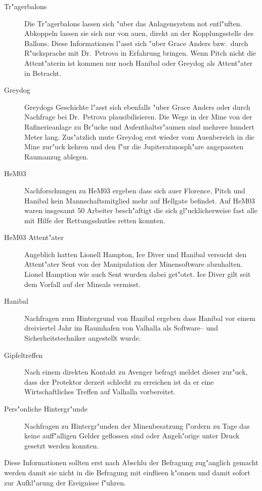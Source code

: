 \begin{description}
	\item[Tr"agerbalons] Die Tr"agerbalons lassen sich "uber das Anlagensystem not entl"uften. Abkoppeln lassen sie sich nur von au\3en, 
		direkt an der Kopplungsstelle des Ballons. Diese Informationen l"asst sich "uber Grace Anders bzw.~durch R"ucksprache mit Dr.~Petrova in Erfahrung bringen. Wenn Pitch nicht die Attent"aterin ist kommen nur noch Hanibal oder Greydog als Attent"ater in Betracht.
	\item[Greydog] Greydogs Geschichte l"asst sich ebenfalls "uber Grace Anders oder durch Nachfrage bei Dr.~Petrova plausibilisieren. Die 
		Wege in der Mine von der Rafinerieanlage zu Br"ucke und Aufenthaltsr"aumen sind mehrere hundert Meter lang. Zus"atzlich mu\3te Greydog erst wieder vom Au\3enbereich in die Mine zur"uck kehren und den f"ur die Jupiteratmosph"are angepassten Raumanzug ablegen.
	\item[HeM03] Nachforschungen zu HeM03 ergeben dass sich au\3er Florence, Pitch und Hanibal kein Mannschaftsmitglied mehr auf Hellgate befindet. Auf HeM03 waren insgesamt 50 Arbeiter besch"aftigt die sich gl"ucklicherweise fast alle mit Hilfe der Rettungsshutles retten konnten. 
	\item[HeM03 Attent"ater] Angeblich hatten Lionell Hampton, Ice Diver und Hanibal versucht den Attent"ater Sent von der Manipulation der 
		Minensoftware abzuhalten. Lionel Hamption wie auch Sent wurden dabei get"otet. Ice Diver gilt seit dem Vorfall auf der Mineals vermisst.
	\item[Hanibal] Nachfragen zum Hintergrund von Hanibal ergeben dass Hanibal vor einem dreiviertel Jahr im Raumhafen von Valhalla als 
		Software-- und Sicherheitstechniker angestellt wurde.
	\item[Gipfeltreffen] Nach einem direkten Kontakt zu Avenger befragt meldet dieser zur"uck, dass der Protektor derzeit schlecht zu 	
		erreichen ist da er eine Wirtschaftliches Treffen auf Valhalla vorbereitet.
	\item[Pers"onliche Hintergr"unde] Nachfragen zu Hintergr"unden der Minenbesatzung f"ordern zu Tage das keine auff"alligen Gelder 
		geflossen sind oder Angeh"orige unter Druck gesetzt werden konnten.
\end{description}

Diese Informationen sollten erst nach Abschlu\3 der Befragung zug"anglich gemacht werden damit sie nicht in die Befragung mit einflie\3en k"onnen und damit sofort zur Aufkl"arung der Ereignisse f"uhren.

